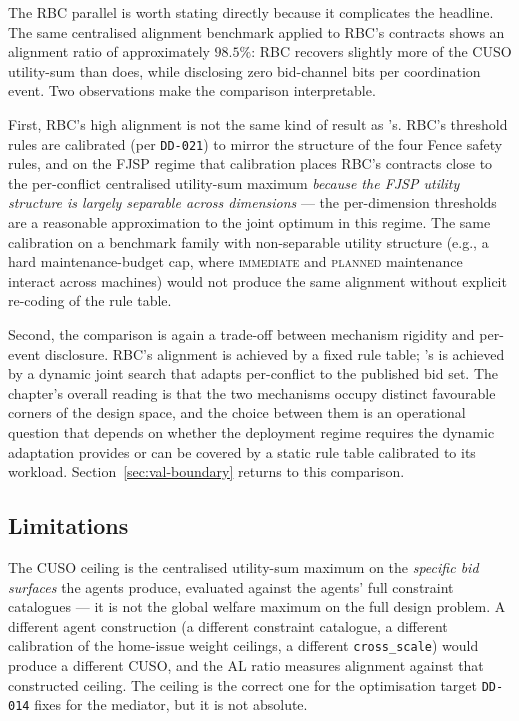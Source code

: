 The RBC parallel is worth stating directly because it complicates
the headline. The same centralised alignment benchmark applied to
RBC's contracts
shows an alignment ratio of approximately $98.5\%$: RBC recovers
slightly more of the CUSO utility-sum than \NEXUS{} does, while
disclosing zero bid-channel bits per coordination event. Two
observations make the comparison interpretable.

First, RBC's high alignment is not the same kind of result as
\NEXUS{}'s. RBC's threshold rules are calibrated (per
\texttt{DD-021}) to mirror the structure of the four Fence safety
rules, and on the FJSP regime that calibration places RBC's
contracts close to the per-conflict centralised utility-sum maximum
\emph{because the FJSP utility structure is largely separable across
dimensions} --- the per-dimension thresholds are a reasonable
approximation to the joint optimum in this regime. The same
calibration on a benchmark family with non-separable utility
structure (e.g., a hard maintenance-budget cap, where
\textsc{immediate} and \textsc{planned} maintenance interact across
machines) would not produce the same alignment without explicit
re-coding of the rule table.

Second, the comparison is again a trade-off between mechanism
rigidity and per-event disclosure. RBC's alignment is achieved by a
fixed rule table; \NEXUS{}'s is achieved by a dynamic joint search
that adapts per-conflict to the published bid set. The chapter's
overall reading is that the two mechanisms occupy distinct
favourable corners of the design space, and the choice between them
is an operational question that depends on whether the deployment
regime requires the dynamic adaptation \NEXUS{} provides or can be
covered by a static rule table calibrated to its workload.
Section~\ref{sec:val-boundary} returns to this comparison.

\subsection*{Limitations}

The CUSO ceiling is the centralised utility-sum maximum on the
\emph{specific bid surfaces} the agents produce, evaluated against
the agents' full constraint catalogues --- it is not the global
welfare maximum on the full design problem. A different agent
construction (a different constraint catalogue, a different
calibration of the home-issue weight ceilings, a different
\texttt{cross\_scale}) would produce a different CUSO, and the AL
ratio measures alignment against that constructed ceiling. The
ceiling is the correct one for the optimisation target
\texttt{DD-014} fixes for the mediator, but it is not absolute.

